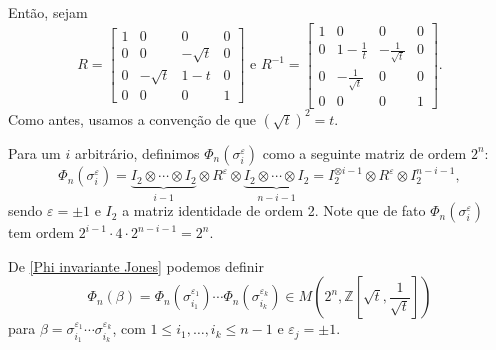 	\par\vspace{0.3cm} Então, sejam
	\begin{equation*}
    	R = \begin{bmatrix}
    	1 & 0 & 0 & 0 \\
    	0 & 0 & -\sqrt{t} & 0 \\
    	0 & -\sqrt{t} & 1-t & 0 \\
    	0 & 0 & 0 & 1
    	\end{bmatrix}\text{ e }R^{-1} = \begin{bmatrix}
    	1 & 0 & 0 & 0 \\
    	0 & 1 - \frac{1}{t} & -\frac{1}{\sqrt{t}} & 0 \\
    	0 & -\frac{1}{\sqrt{t}} & 0 & 0 \\
    	0 & 0 & 0 & 1
    	\end{bmatrix}.
	\end{equation*}
	Como antes, usamos a convenção de que $(\sqrt{t})^2 = t$.
	
	\par\vspace{0.3cm} Para um $i$ arbitrário, definimos $\Phi_n(\sigma_i^{\varepsilon})$ 
	como a seguinte matriz de ordem $2^n$:
	\begin{equation}
	\label{Phi invariante Jones}
	    \Phi_n(\sigma_i^{\varepsilon}) 
	    = \underbrace{I_2\otimes\cdots\otimes I_2}_{i-1}
	    \otimes R^{\varepsilon}\otimes\underbrace{I_2\otimes\cdots\otimes I_2}_{n-i-1}
	    = I_2^{\otimes i-1}\otimes R^{\varepsilon}\otimes I_2^{n-i-1},
	\end{equation}
	sendo $\varepsilon=\pm1$ e $I_2$ a matriz identidade de ordem 2. Note que de fato
	$\Phi_n(\sigma_i^{\varepsilon})$ tem ordem $2^{i-1}\cdot4\cdot2^{n-i-1} = 2^n$.
	
	\par\vspace{0.3cm} De \eqref{Phi invariante Jones} podemos definir
	\begin{equation}
	\label{parte 2 invariante Jones}
    	\Phi_n(\beta) 
    	= \Phi_n(\sigma_{i_1}^{\varepsilon_1})\cdots\Phi_n(\sigma_{i_k}^{\varepsilon_k})
    	\in M(2^n, \mathbb{Z}[\sqrt{t}, \frac{1}{\sqrt{t}}])
	\end{equation}
	para $\beta = \sigma_{i_1}^{\varepsilon_1}\cdots\sigma_{i_k}^{\varepsilon_k}$, 
	com $1\leq i_1, \dots, i_k\leq n-1$ e $\varepsilon_j=\pm1$.
	
